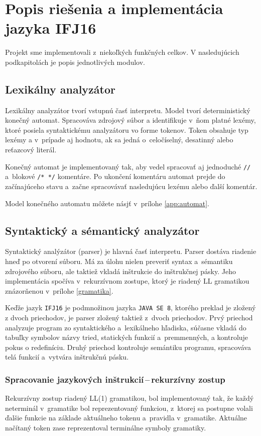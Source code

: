 \documentclass[11pt,a4paper]{article}
\begin{document}
	\section{Popis riešenia a implementácia jazyka IFJ16}
	\label{popis}

	Projekt sme implementovali z~niekoľkých funkčných celkov. V nasledujúcich podkapitolách je popis jednotlivých modulov.

	\subsection{Lexikálny analyzátor}
	\label{lexer}
	Lexikálny analyzátor tvorí vstupnú časť interpretu. Model tvorí deterministický
	konečný automat. Spracováva zdrojový súbor a identifikuje v~ňom platné lexémy,
	ktoré posiela syntaktickému analyzátoru vo forme tokenov. Token obsahuje typ lexémy
	a v~prípade aj hodnotu, ak sa jedná o~celočíselný, desatinný alebo reťazcový literál.

	Konečný automat je implementovaný tak, aby vedel spracovať aj jednoduché \texttt{//}
	a~blokové \texttt{/* */} komentáre. Po ukončení komentáru  automat prejde do
	začínajúceho stavu a~začne spracovávať nasledujúcu lexému alebo ďalší komentár.

	Model konečného automatu môžete násjť v~prílohe \ref{app:automat}.


	\subsection{Syntaktický a sémantický analyzátor}
	\label{parser}
	Syntaktický analýzátor (parser) je hlavná časť interpretu. Parser dostáva
	riadenie hneď po otvorení súboru. Má za úlohu nielen preveriť syntax
	a~sémantiku zdrojového súboru, ale taktiež vkladá inštrukcie do inštrukčnej
	pásky. Jeho implementácia spočíva v~rekurzívnom zostupe, ktorý je riadený
	LL gramatikou znázorňenou v~prílohe \ref{gramatika}.

	Keďže jazyk \texttt{IFJ16} je podmnožinou jazyka \texttt{JAVA SE 8},
	ktorého preklad je zložený z dvoch priechodov, je parser zložený
	taktiež z~dvoch priechodov. Prvý priechod analyzuje program zo syntaktického
	a~lexikálneho hľadiska, súčasne vkladá do tabuľky symbolov názvy tried,
	statických funkcií a~premmenných, a kontroluje pokus o redefiníciu.
	Druhý priechod kontroluje semántiku
	programu, spracováva telá funkcií a~vytvára inštrukčnú pásku.



	\subsubsection{Spracovanie jazykových inštrukcií\,--\,rekurzívny zostup}
	\label{rekurzia}
	Rekurzívny zostup riadený LL(1) gramatikou, bol implementovaný tak, že každý
	neterminál v~gramatike bol reprezentovaný funkciou, z~ktorej sa postupne
	volali ďalšie funkcie na základe aktuálneho tokenu a~pravidla v~gramatike.
	Aktuálne načítaný token zase reprezentoval terminálne symboly gramatiky.
\end{document}
